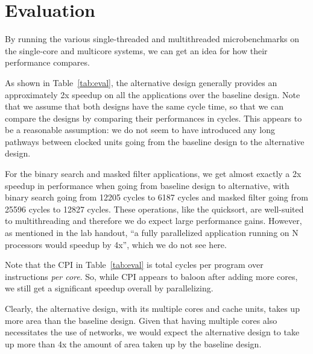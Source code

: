 \documentclass[10pt]{article}
\begin{document}
\section{Evaluation}

By running the various single-threaded and multithreaded microbenchmarks on the single-core and multicore systems, we can get an idea for how their performance compares. 

As shown in Table~\ref{tab:eval}, the alternative design generally provides an approximately 2x speedup on all the applications over the baseline design. Note that we assume that both designs have the same cycle time, so that we can compare the designs by comparing their performances in cycles. This appears to be a reasonable assumption: we do not seem to have introduced any long pathways between clocked units going from the baseline design to the alternative design.

For the binary search and masked filter applications, we get almost exactly a 2x speedup in performance when going from baseline design to alternative, with binary search going from 12205 cycles to 6187 cycles and masked filter going from 25596 cycles to 12827 cycles. These operations, like the quicksort, are well-suited to multithreading and therefore we do expect large performance gains. However, as mentioned in the lab handout, ``a fully parallelized application running on N processors would speedup by 4x'', which we do not see here.


Note that the CPI in Table~\ref{tab:eval} is total cycles per program over instructions \textit{per core}. So, while CPI appears to baloon after adding more cores, we still get a significant speedup overall by parallelizing.

Clearly, the alternative design, with its multiple cores and cache units, takes up more area than the baseline design. Given that having multiple cores also necessitates the use of networks, we would expect the alternative design to take up more than 4x the amount of area taken up by the baseline design.
\end{document}
